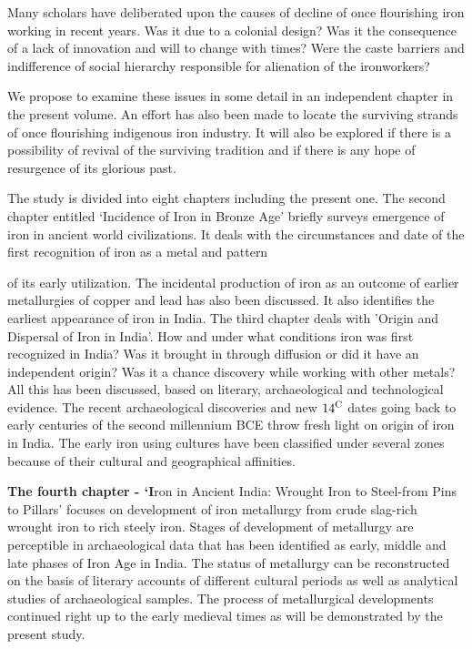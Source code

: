 Many scholars have deliberated upon the causes of decline of once flourishing iron working in recent years. Was it due to a colonial design? Was it the consequence of a lack of innovation and will to change with times? Were the caste barriers and indifference of social hierarchy responsible for alienation of the ironworkers?

We propose to examine these issues in some detail in an independent chapter in the present volume. An effort has also been made to locate the surviving strands of once flourishing indigenous iron industry. It will also be explored if there is a possibility of revival of the surviving tradition and if there is any hope of resurgence of its glorious past.

The study is divided into eight chapters including the present one. The second chapter entitled `Incidence of Iron in Bronze Age' briefly surveys emergence of iron in ancient world civilizations. It deals with the circumstances and date of the first recognition of iron as a metal and pattern

of its early utilization. The incidental production of iron as an outcome of earlier metallurgies of copper and lead has also been discussed. It also identifies the earliest appearance of iron in India. The third chapter deals with 'Origin and Dispersal of Iron in India'. How and under what conditions iron was first recognized in India? Was it brought in through diffusion or did it have an independent origin? Was it a chance discovery while working with other metals? All this has been discussed, based on literary, archaeological and technological evidence. The recent archaeological discoveries and new ${14}^{\rm C}$ dates going back to early centuries of the second millennium BCE throw fresh light on origin of iron in India. The early iron using cultures have been classified under several zones because of their cultural and geographical affinities.

\textbf{The fourth chapter - ‘I}ron in Ancient India: Wrought Iron to Steel-from Pins to Pillars’ focuses on development of iron metallurgy from crude slag-rich wrought iron to rich steely iron. Stages of development of metallurgy are perceptible in archaeological data that has been identified as early, middle and late phases of Iron Age in India. The status of metallurgy can be reconstructed on the basis of literary accounts of different cultural periods as well as analytical studies of archaeological samples. The process of metallurgical developments continued right up to the early medieval times as will be demonstrated by the present study.


